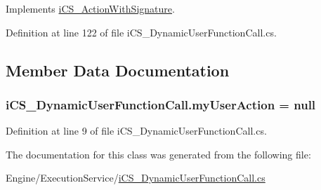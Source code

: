 Implements \hyperlink{classi_c_s___action_with_signature_ab62366545f5e9079753a1292a3a76354}{i\+C\+S\+\_\+\+Action\+With\+Signature}.



Definition at line 122 of file i\+C\+S\+\_\+\+Dynamic\+User\+Function\+Call.\+cs.



\subsection{Member Data Documentation}
\hypertarget{classi_c_s___dynamic_user_function_call_aebbaabd1ab956b102ad24210a9e6eca0}{
\subsubsection[{my\+User\+Action}]{ i\+C\+S\+\_\+\+Dynamic\+User\+Function\+Call.\+my\+User\+Action = null\hspace{0.3cm}{\ttfamily [protected]}}}\label{classi_c_s___dynamic_user_function_call_aebbaabd1ab956b102ad24210a9e6eca0}


Definition at line 9 of file i\+C\+S\+\_\+\+Dynamic\+User\+Function\+Call.\+cs.



The documentation for this class was generated from the following file\+:\begin{DoxyCompactItemize}
\item 
Engine/\+Execution\+Service/\hyperlink{i_c_s___dynamic_user_function_call_8cs}{i\+C\+S\+\_\+\+Dynamic\+User\+Function\+Call.\+cs}\end{DoxyCompactItemize}
